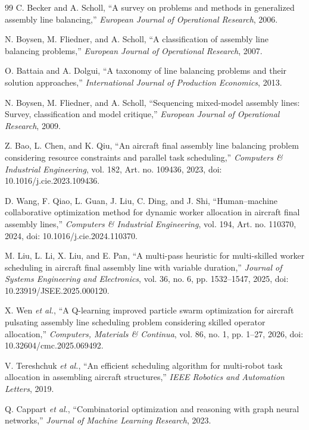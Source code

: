 \begin{thebibliography}{99}
C. Becker and A. Scholl, ``A survey on problems and methods in generalized assembly line balancing,'' \emph{European Journal of Operational Research}, 2006.

N. Boysen, M. Fliedner, and A. Scholl, ``A classification of assembly line balancing problems,'' \emph{European Journal of Operational Research}, 2007.

O. Battaia and A. Dolgui, ``A taxonomy of line balancing problems and their solution approaches,'' \emph{International Journal of Production Economics}, 2013.

N. Boysen, M. Fliedner, and A. Scholl, ``Sequencing mixed-model assembly lines: Survey, classification and model critique,'' \emph{European Journal of Operational Research}, 2009.

Z. Bao, L. Chen, and K. Qiu, ``An aircraft final assembly line balancing problem considering resource constraints and parallel task scheduling,'' \emph{Computers \& Industrial Engineering}, vol. 182, Art. no. 109436, 2023, doi: 10.1016/j.cie.2023.109436.

D. Wang, F. Qiao, L. Guan, J. Liu, C. Ding, and J. Shi, ``Human--machine collaborative optimization method for dynamic worker allocation in aircraft final assembly lines,'' \emph{Computers \& Industrial Engineering}, vol. 194, Art. no. 110370, 2024, doi: 10.1016/j.cie.2024.110370.

M. Liu, L. Li, X. Liu, and E. Pan, ``A multi-pass heuristic for multi-skilled worker scheduling in aircraft final assembly line with variable duration,'' \emph{Journal of Systems Engineering and Electronics}, vol. 36, no. 6, pp. 1532--1547, 2025, doi: 10.23919/JSEE.2025.000120.

X. Wen \emph{et al.}, ``A Q-learning improved particle swarm optimization for aircraft pulsating assembly line scheduling problem considering skilled operator allocation,'' \emph{Computers, Materials \& Continua}, vol. 86, no. 1, pp. 1--27, 2026, doi: 10.32604/cmc.2025.069492.

V. Tereshchuk \emph{et al.}, ``An efficient scheduling algorithm for multi-robot task allocation in assembling aircraft structures,'' \emph{IEEE Robotics and Automation Letters}, 2019.

Q. Cappart \emph{et al.}, ``Combinatorial optimization and reasoning with graph neural networks,'' \emph{Journal of Machine Learning Research}, 2023.


\end{thebibliography}
